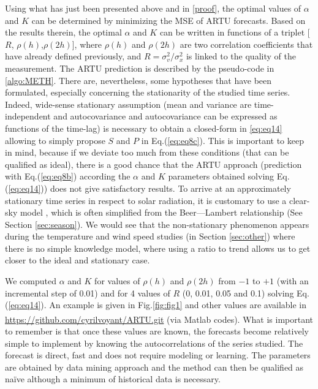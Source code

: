Using what has just been presented above and in \ref{proof}, the optimal values of $\alpha$ and $K$ can be determined by minimizing the MSE of ARTU forecasts. Based on the results therein, the optimal $\alpha$ and $K$ can be written in functions of a triplet [$R$, $\rho(h)$,$\rho(2h)$], where $\rho(h)$ and $\rho(2h)$ are two correlation coefficients that have already defined previously, and $R=\sigma^2_{v}/\sigma_x^2$ is linked to the quality of the measurement. The ARTU prediction is described by the pseudo-code in \ref{algo:METH}. There are, nevertheless, some hypotheses that have been formulated, especially concerning the stationarity of the studied time series. Indeed, wide-sense stationary assumption (mean and variance are time-independent and autocovariance and autocovariance can be expressed as functions of the time-lag) is necessary to obtain a closed-form in \ref{eq:eq14} allowing to simply propose $S$ and $P$ in Eq.(\ref{eq:eq8c}). This is important to keep in mind, because if we deviate too much from these conditions (that can be qualified as ideal), there is a good chance that the ARTU approach (prediction with Eq.(\ref{eq:eq8b}) according the $\alpha$ and $K$ parameters obtained solving Eq.(\ref{eq:eq14})) does not give satisfactory results. To arrive at an approximately stationary time series in respect to solar radiation, it is customary to use a clear-sky model \citep{SUN2021110087}, which is often simplified from the Beer—Lambert relationship (See Section \ref{sec:season}). 
We would see that the non-stationary phenomenon appears during the temperature and wind speed studies (in Section \ref{sec:other}) where there is no simple knowledge model, where using a ratio to trend allows us to get closer to the ideal and stationary case. 

We computed $\alpha$ and $K$ for values of $\rho(h)$ and $\rho(2h)$ from $-1$ to $+1$ (with an incremental step of 0.01) and for 4 values of $R$ (0, 0.01, 0.05 and 0.1) solving Eq.(\ref{eq:eq14}). An example is given in Fig.\ref{fig:fig1} and other values are available in \url{https://github.com/cyrilvoyant/ARTU.git} (via Matlab\textsuperscript{\tiny\textregistered} codes). What is important to remember is that once these values are known, the forecasts become relatively simple to implement by knowing the autocorrelations of the series studied. The forecast is direct, fast and does not require modeling or learning. The parameters are obtained by data mining approach and the method can then be qualified as na\"ive although a minimum of historical data is necessary. 

